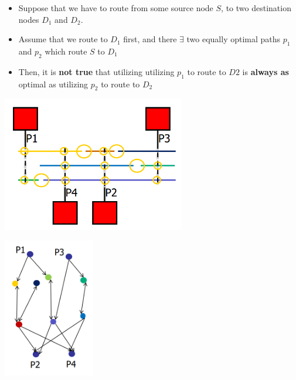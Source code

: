 \documentclass{article}
\begin{document}
\begin{itemize}
    \item Suppose that we have to route from some source node $S$, to two destination nodes $D_{1}$ and $D_{2}$.
    \item Assume that we route to $D_{1}$ first, and there $\exists$ two equally optimal paths $p_{1}$ and $p_{2}$ which route $S$ to $D_{1}$
    \item Then, it is \textbf{not true} that utilizing utilizing $p_{1}$ to route to $D{2}$ is \textbf{always as} optimal as utilizing $p_{2}$ to route to $D_{2}$
\end{itemize}

\begin{minipage}[t]{0.5\textwidth}
    \centering
    \includegraphics[width=8cm, scale=1]{routing1.PNG}
\end{minipage}%
\begin{minipage}[t]{0.5\textwidth}
    \centering
    \includegraphics[width=4cm, scale=1]{routing2.PNG}
\end{minipage}%
\end{document}
